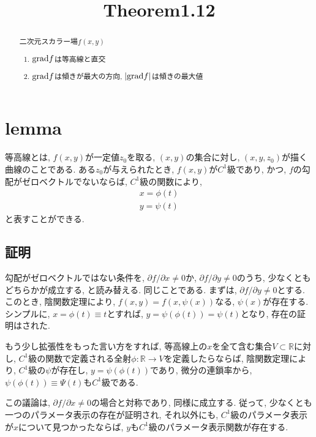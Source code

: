 \documentclass{jsarticle}
\title{Theorem1.12}
\newcommand*{\grad}{{\rm grad}}
\begin{document}
\maketitle

\begin{abstract}
  二次元スカラー場$f(x, y)$
  \begin{enumerate}
    \item $\grad f$は等高線と直交 \label{item-1}
    \item $\grad f$は傾きが最大の方向, $|\grad f |$は傾きの最大値
  \end{enumerate}
\end{abstract}

\section*{lemma}
等高線とは, $f(x, y)$が一定値$z_0$を取る, $(x, y)$の集合に対し, $(x, y, z_0)$が描く曲線のことである. 
ある$z_0$が与えられたとき, $f(x, y)$が$C^1$級であり, かつ, $f$の勾配がゼロベクトルでないならば, $C^1$級の関数により, 
\begin{subequations}
  \begin{eqnarray}
    x = \phi(t) \\
    y = \psi(t)
  \end{eqnarray}
\end{subequations}
と表すことができる. 

\subsection*{証明}
勾配がゼロベクトルではない条件を, $\partial f / \partial x \neq 0$か, $\partial f / \partial y \neq 0$のうち, 少なくともどちらかが成立する, と読み替える. 同じことである. 
まずは, $\partial f / \partial y \neq 0$とする. 
このとき, 陰関数定理により, $f(x, y) = f(x, \psi(x))$なる, $\psi(x)$が存在する. 
シンプルに, $x = \phi(t) \equiv t$とすれば, $y = \psi(\phi(t)) = \psi(t)$となり, 存在の証明はされた. 

もう少し拡張性をもった言い方をすれば, 等高線上の$x$を全て含む集合$V \subset \mathbb{R}$に対し, 
$C^1$級の関数で定義される全射$\phi : \mathbb{R} \rightarrow V$を定義したらならば, 
陰関数定理により, $C^1$級の$\psi$が存在し, $y = \psi(\phi(t))$であり, 微分の連鎖率から, $\psi(\phi(t)) \equiv \Psi(t)$も$C^1$級である. 

この議論は, $\partial f / \partial x \neq 0$の場合と対称であり, 同様に成立する. 
従って, 少なくとも一つのパラメータ表示の存在が証明され, それ以外にも, $C^1$級のパラメータ表示が$x$について見つかったならば, $y$も$C^1$級のパラメータ表示関数が存在する. 
\end{document}
